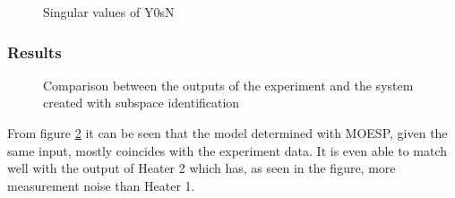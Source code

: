 \begin{figure}[ht]
    \centering
    
    \caption{Singular values of Y0sN}
    \label{fig:SingularY0sN}
\end{figure}

\subsubsection{Results}


\begin{figure}[ht]
    \centering
    
    \caption{Comparison between the outputs of the experiment and the system created with subspace identification}
    \label{fig:Comp_subID}
\end{figure}

From figure \ref{fig:Comp_subID} it can be seen that the model determined with MOESP, given the same input, mostly coincides with the experiment data. It is even able to match well with the output of Heater 2 which has, as seen in the figure, more measurement noise than Heater 1.  
